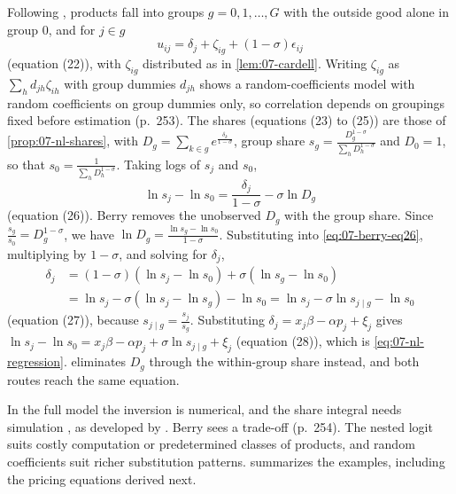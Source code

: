 Following \citet{Cardell1997}, products fall into groups $g = 0, 1, \dots, G$ with the outside good alone in
group $0$, and for $j \in g$
\begin{equation*}
u_{ij} = \delta_j + \zeta_{ig} + (1 - \sigma)\epsilon_{ij}
\end{equation*}
(equation (22)), with $\zeta_{ig}$ distributed as in \cref{lem:07-cardell}. Writing $\zeta_{ig}$ as $\sum_h
d_{jh}\zeta_{ih}$ with group dummies $d_{jh}$ shows a random-coefficients model with random coefficients on group
dummies only, so correlation depends on groupings fixed before estimation (p.~253). The shares (equations (23) to
(25)) are those of \cref{prop:07-nl-shares}, with $D_g = \sum_{k \in g} e^{\frac{\delta_k}{1-\sigma}}$, group share
$s_g = \frac{D_g^{1-\sigma}}{\sum_h D_h^{1-\sigma}}$ and $D_0 = 1$, so that $s_0 = \frac{1}{\sum_h
D_h^{1-\sigma}}$. Taking logs of $s_j$ and $s_0$,
\begin{equation}\label{eq:07-berry-eq26}
\ln s_j - \ln s_0 = \frac{\delta_j}{1-\sigma} - \sigma\ln D_g
\end{equation}
(equation (26)). Berry removes the unobserved $D_g$ with the group share. Since $\frac{s_g}{s_0} = D_g^{1-\sigma}$,
we have $\ln D_g = \frac{\ln s_g - \ln s_0}{1-\sigma}$. Substituting into \eqref{eq:07-berry-eq26}, multiplying by
$1-\sigma$, and solving for $\delta_j$,
\begin{align*}
\delta_j &= (1-\sigma)(\ln s_j - \ln s_0) + \sigma(\ln s_g - \ln s_0) \\
&= \ln s_j - \sigma(\ln s_j - \ln s_g) - \ln s_0 = \ln s_j - \sigma\ln s_{j\mid g} - \ln s_0
\end{align*}
(equation (27)), because $s_{j\mid g} = \frac{s_j}{s_g}$. Substituting $\delta_j = x_j\beta - \alpha p_j + \xi_j$
gives $\ln s_j - \ln s_0 = x_j\beta - \alpha p_j + \sigma\ln s_{j\mid g} + \xi_j$ (equation (28)), which is
\eqref{eq:07-nl-regression}.  eliminates $D_g$ through the within-group share
instead, and both routes reach the same equation.

In the full model the inversion is numerical, and the share integral needs simulation \citep{Pakes1986}, as
developed by \citet{BerryLevinsohnPakes1995}. Berry sees a trade-off (p.~254). The nested logit suits costly
computation or predetermined classes of products, and random coefficients suit richer substitution patterns.
 summarizes the examples, including the pricing equations derived next.

